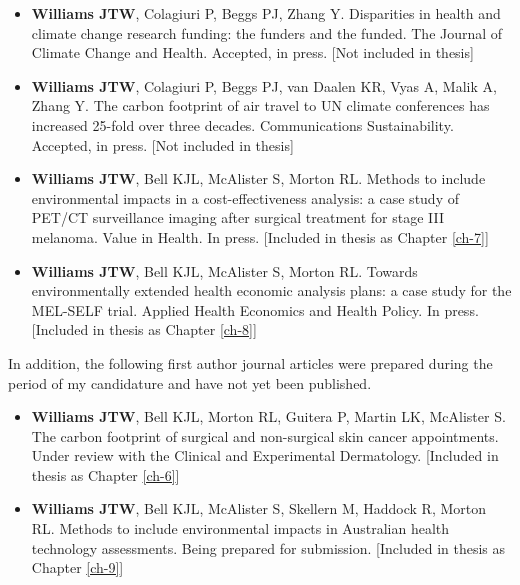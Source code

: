 \begin{itemize}
    \item \textbf{Williams JTW}, Colagiuri P, Beggs PJ, Zhang Y. Disparities in health and climate change research funding: the funders and the funded. The Journal of Climate Change and Health. Accepted, in press. [Not included in thesis]
    \item \textbf{Williams JTW}, Colagiuri P, Beggs PJ, van Daalen KR, Vyas A, Malik A, Zhang Y. The carbon footprint of air travel to UN climate conferences has increased 25-fold over three decades. Communications Sustainability. Accepted, in press. [Not included in thesis]
    \item \textbf{Williams JTW}, Bell KJL, McAlister S, Morton RL. Methods to include environmental impacts in a cost-effectiveness analysis: a case study of PET/CT surveillance imaging after surgical treatment for stage III melanoma. Value in Health. In press. [Included in thesis as Chapter \ref{ch-7}]
    \item \textbf{Williams JTW}, Bell KJL, McAlister S, Morton RL. Towards environmentally extended health economic analysis plans: a case study for the MEL-SELF trial. Applied Health Economics and Health Policy. In press. [Included in thesis as Chapter \ref{ch-8}]
\end{itemize}

In addition, the following first author journal articles were prepared during the period of my candidature and have not yet been published.

\begin{itemize}
    \item \textbf{Williams JTW}, Bell KJL, Morton RL, Guitera P, Martin LK, McAlister S. The carbon footprint of surgical and non-surgical skin cancer appointments. Under review with the Clinical and Experimental Dermatology. [Included in thesis as Chapter \ref{ch-6}]
    \item \textbf{Williams JTW}, Bell KJL, McAlister S, Skellern M, Haddock R, Morton RL. Methods to include environmental impacts in Australian health technology assessments. Being prepared for submission. [Included in thesis as Chapter \ref{ch-9}]
\end{itemize}

